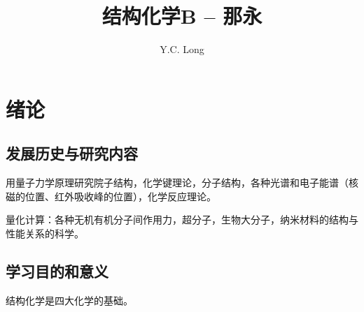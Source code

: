 \documentclass[a4paper]{ctexrep}
\title{结构化学B -- 那永}
\author{Y.C. Long}
\begin{document}
    \maketitle
    \chapter{绪论}
    \section{发展历史与研究内容}

    用量子力学原理研究院子结构，化学键理论，分子结构，各种光谱和电子能谱（核磁的位置、红外吸收峰的位置），化学反应理论。

    量化计算：各种无机有机分子间作用力，超分子，生物大分子，纳米材料的结构与性能关系的科学。

    \section{学习目的和意义}

    结构化学是四大化学的基础。
\end{document}
